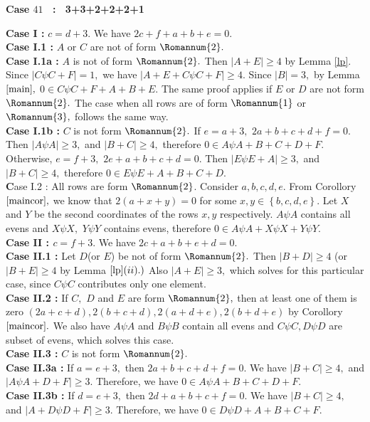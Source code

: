 \documentclass[reqno,10pt]{amsart}
\newcommand{\one}{ \Romannum {1}}
\newcommand{\two}{\Romannum {2}}
\newcommand{\three}{ \Romannum {3} }
\begin{document}
\begin{center}
 \textbf{Case $41$ \ : \ 3+3+2+2+2+1}
 \end{center}	
\textbf {Case I : } $c=d+3.$ We have $2c+f+a+b+e =0.$ \\
\textbf {Case I.1 :} $A$ or $C$ are not of form $\two.$\\
\textbf {Case I.1a :} $A$ is not of form $\two.$ Then $|A+E| \geq 4$ by Lemma \ref{lp}. Since $| C \psi C+F|=1,$ we have
 $|A+E+C \psi C+F| \geq 4.$ Since $|B|=3,$ by Lemma $\ref{main},$  $0 \in C \psi C+F +A+B+E. $ The same proof applies if $E$ or $D$ are not form $\two.$ The case when all rows are of form $\one$ or $\three,$ follows the same way. \\
\textbf {Case I.1b :} $C$ is not form $\two.$ If $e=a+3,$ $2a+b+c+d+f = 0.$ Then $|A \psi A| \geq 3,$ and $|B +C| \geq 4,$ therefore 
$0 \in A\psi A+B+C+D+F.$ Otherwise, $e=f+3,$ $2e+a+b+c+d = 0.$ Then $|E \psi E + A| \geq 3,$ and $|B+C| \geq 4,$ therefore
$0 \in E \psi E +A+B+C+D.$\\
{\textbf Case I.2 :} All rows are form $\two$. Consider $a,b,c,d,e.$ From Corollory $\ref{maincor},$ we know that $2(a+x+y)=0$ for some $x,y \in \left\lbrace b,c,d,e \right\rbrace.$ Let $X$ and $Y$ be the second coordinates of the rows $x, y$ respectively. $A \psi A$ contains all evens and $X \psi X,$ $Y  \psi Y$ contains evens, therefore $ 0 \in A\psi  A + X \psi X + Y \psi Y.$\\
\textbf {Case II : $c=f+3.$} We have $2c+a+b+e+d=0.$ \\
\textbf {Case II.1 :} Let $D$(or $E$) be not of form $\two.$ Then  $ |B+D| \geq 4 $ (or  $ |B+E| \geq 4 $  by Lemma $\ref{lp} (ii).)$ Also $ |A+E| \geq 3, $ which solves for this particular case, since $ C \psi C$ contributes only one element.\\
\textbf {Case II.2 :} If $C,$ $D$ and $E$ are form $\two,$ then at least one of them is zero $(2a+c+d),2(b+c+d),2(a+d+e),2(b+d+e)$  by Corollory $\ref{maincor}.$  We also have $A \psi A$ and $B \psi B$ contain all evens and $ C \psi C , D \psi D $ are subset of evens, which solves this case.\\
\textbf {Case II.3 :} $C$ is not form $\two.$\\
 \textbf {Case II.3a :} If $a=e+3,$ then $2a+b+c+d+f = 0.$ We have $|B+C| \geq 4,$ and $|A \psi A +D+F| \geq 3.$ Therefore, we have $0 \in A \psi A +B+C+D+F.$\\
 \textbf {Case II.3b :} If $d=e+3,$ then $2d+a+b+c+f = 0.$ We have $|B+C| \geq 4,$ and $|A+D \psi D +F| \geq 3.$ Therefore, we have $0 \in D \psi D +A +B+C+F.$\\
\end{document}
